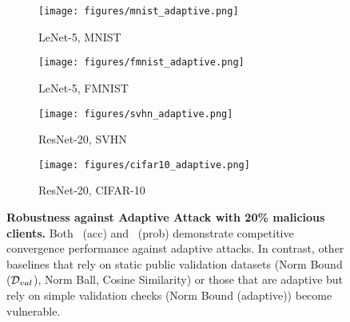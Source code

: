 \begin{figure*}[ht]
\captionsetup[subfigure]{justification=centering}
    \centering
    \begin{subfigure}{0.24\textwidth}
        \texttt{[image: figures/mnist\_adaptive.png]}
        \caption{LeNet-5, MNIST}
        \label{subfig:adaptive-mnist}
    \end{subfigure}
    \hspace{.2mm}
    \begin{subfigure}{0.24\textwidth}
        \texttt{[image: figures/fmnist\_adaptive.png]}
        \caption{LeNet-5, FMNIST}
        \label{subfig:adaptive-fmnist}
    \end{subfigure}
    \hspace{.2mm}
    \begin{subfigure}{0.24\textwidth}
        \texttt{[image: figures/svhn\_adaptive.png]}
        \caption{ResNet-20, SVHN}
        \label{subfig:adaptive-svhn}
    \end{subfigure}
    \hspace{.2mm}
    \begin{subfigure}{0.24\textwidth}
        \texttt{[image: figures/cifar10\_adaptive.png]}
        \caption{ResNet-20, CIFAR-10}
        \label{subfig:adaptive-cifar10}
    \end{subfigure}
    \caption{\textbf{Robustness against Adaptive Attack with 20\% malicious clients.} Both \ours~(acc) and \ours~(prob) demonstrate competitive convergence performance against adaptive attacks. In contrast, other baselines that rely on static public validation datasets (\eg Norm Bound ($\mathcal{D}_{val}$), Norm Ball, Cosine Similarity) or those that are adaptive but rely on simple validation checks (\eg Norm Bound (adaptive)) become vulnerable.
    }
    \label{fig:adaptiveattack}
\end{figure*}
